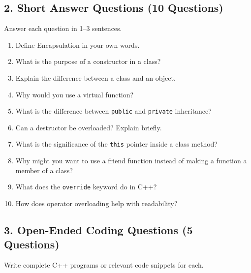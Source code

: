 \documentclass[a4paper,12pt]{article}
\begin{document}
\newpage

\subsection{2. Short Answer Questions (10 Questions)}
Answer each question in 1--3 sentences.

\begin{enumerate}
    \item Define Encapsulation in your own words.
    \item What is the purpose of a constructor in a class?
    \item Explain the difference between a class and an object.
    \item Why would you use a virtual function?
    \item What is the difference between \texttt{public} and \texttt{private} inheritance?
    \item Can a destructor be overloaded? Explain briefly.
    \item What is the significance of the \texttt{this} pointer inside a class method?
    \item Why might you want to use a friend function instead of making a function a member of a class?
    \item What does the \texttt{override} keyword do in C++?
    \item How does operator overloading help with readability?
\end{enumerate}

\newpage
\subsection{3. Open-Ended Coding Questions (5 Questions)}
Write complete C++ programs or relevant code snippets for each.
\end{document}
